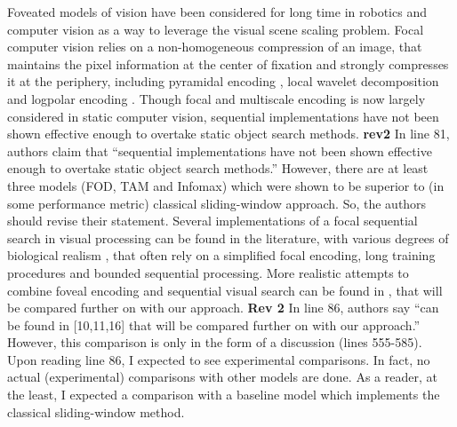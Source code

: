 Foveated models of vision have been considered for long time in robotics and computer vision as a way to leverage the visual scene scaling problem. Focal computer vision relies on a non-homogeneous compression of an image, that maintains the pixel information at the center of fixation and strongly compresses it at the periphery, including pyramidal encoding \cite{kortum1996implementation,Butko2010infomax}, local wavelet decomposition \cite{dauce2018active} and logpolar encoding \cite{fischer2007self,Traver10}. Though focal and multiscale encoding is now largely considered in static computer vision, sequential implementations have not been shown effective enough to overtake static object search methods.
{\color{red} \textbf{rev2} In line 81, authors claim that “sequential implementations have not been shown effective enough to overtake static object search methods.” However, there are at least three models (FOD, TAM and Infomax) which were shown to be superior to (in some performance metric) classical sliding-window approach. So, the authors should revise their statement.
}
Several implementations of a focal sequential search in visual processing can be found in the literature, with various degrees of biological realism \cite{mnih2014recurrent,fu2017look}, that often rely on a simplified focal encoding, long training procedures and bounded sequential processing. More realistic attempts to combine foveal encoding and sequential visual search can be {\color{red} found in \cite{Butko2010infomax,denil2012learning,dauce2018active}}, that will be compared further on with our approach.
{\color{red} \textbf{Rev 2}
In line 86, authors say “can be found in [10,11,16] that will be compared further on with our approach.” However, this comparison is only in the form of a discussion (lines 555-585). Upon reading line 86, I expected to see experimental comparisons. In fact, no actual (experimental) comparisons with other models are done. As a reader, at the least, I expected a comparison with a baseline model which implements the classical sliding-window method.
}


